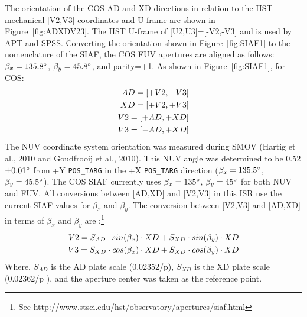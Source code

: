 The orientation of the COS AD and XD directions in relation to the HST mechanical [V2,V3] coordinates
and U-frame are shown in Figure~\ref{fig:ADXDV23}. The HST U-frame of [U2,U3]=[-V2,-V3] and is used by APT
and SPSS.  Converting the orientation shown in Figure~\ref{fig:SIAF1} to
the nomenclature of the SIAF, the COS FUV apertures are aligned as follows:
$\beta_{x}=135.8\hbox{$^{\circ}$}$, $\beta_y=45.8\hbox{$^{\circ}$}$, and parity=+1. As shown in Figure~\ref{fig:SIAF1}, for COS:
\begin{eqnarray}
\setlength\itemsep{0.1em}
AD = [+V2,-V3]\label{eq:ADV23}\\
XD = [+V2,+V3]\label{eq:XDV23}\\
V2 = [+AD,+XD]\label{eq:V2ADXD}\\
V3 = [-AD,+XD]\label{eq:V3ADXD}
\end{eqnarray}
\normalsize
The NUV coordinate system orientation was measured during SMOV (Hartig et al., 2010 and Goudfrooij et al., 2010).
This NUV angle was determined to be 0.52 $\pm 0.01\hbox{$^{\circ}$}$ from +Y \texttt{POS\_TARG} in the +X \texttt{POS\_TARG} direction
($\beta_{x}=135.5\hbox{$^{\circ}$}$, $\beta_y=45.5\hbox{$^{\circ}$}$). The COS SIAF currently uses $\beta_{x}=135\hbox{$^{\circ}$}$, $\beta_y=45\hbox{$^{\circ}$}$ for both NUV and FUV.
All conversions between [AD,XD] and [V2,V3] in this ISR use the current SIAF values for  $\beta_{x}$ and $\beta_{y}$.
The conversion between [V2,V3] and [AD,XD] in terms of $\beta_{x}$ and $\beta_{y}$ are :\footnote{See http://www.stsci.edu/hst/observatory/apertures/siaf.html}
\begin{eqnarray}
\setlength\itemsep{0.1em}
	V2 = S_{AD} \cdot sin(\beta_x) \cdot XD	+ S_{XD} \cdot sin(\beta_y) \cdot XD \label{eq:V2beta}\label{eq:V2BETA}\\
	V3 = S_{XD} \cdot cos(\beta_x) \cdot XD	+ S_{XD} \cdot cos(\beta_y) \cdot XD \label{eq:V3beta}\label{eq:V3BETA}
\end{eqnarray}
Where, $S_{AD}$ is the AD plate scale (0.02352\arcsec/p), $S_{XD}$ is the XD plate scale (0.02362\arcsec/p ), and the aperture center was taken as the reference point.

